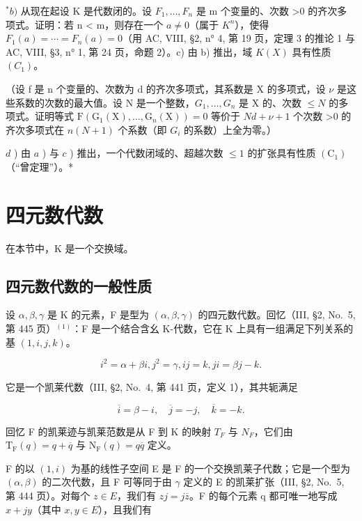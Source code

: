\(^{*}b)\) 从现在起设 K 是代数闭的。设 \(F_{1},\ldots,F_{n}\) 是 m 个变量的、次数 \textgreater0 的齐次多项式。证明：若 n \textless{} m，则存在一个 \(a \neq 0\)（属于 \(K^{n}\)），使得 \(F_{1}(a) = \cdots = F_{n}(a) = 0\)（用 AC, VIII, §2, n° 4, 第 19 页，定理 3 的推论 1 与 AC, VIII, §3, n° 1, 第 24 页，命题 2）。c) 由 b) 推出，域 \(K(X)\) 具有性质 \((C_{1})\)。

（设 f 是 n 个变量的、次数为 d 的齐次多项式，其系数是 X 的多项式，设 \(\nu\) 是这些系数的次数的最大值。设 N 是一个整数，\(G_{1},\ldots,G_{n}\) 是 X 的、次数 \(\leqslant N\) 的多项式。证明等式 \(\mathrm{F}(\mathrm{G}_{1}(\mathrm{X}),\ldots,\mathrm{G}_{n}(\mathrm{X}))=0\) 等价于 \(Nd+\nu+1\) 个次数 \textgreater0 的齐次多项式在 \(n(N+1)\) 个系数（即 \(G_{i}\) 的系数）上全为零。）

\(d\) ) 由 \(a\) ) 与 \(c\) ) 推出，一个代数闭域的、超越次数 \(\leqslant 1\) 的扩张具有性质 \((\mathrm{C}_1)\)（``曾定理''）。*

\section{四元数代数}

在本节中，K 是一个交换域。

\subsection{四元数代数的一般性质}

设 \(\alpha, \beta, \gamma\) 是 K 的元素，F 是型为 \((\alpha, \beta, \gamma)\) 的四元数代数。回忆（III, §2, No.~5, 第 445 页）\(^{(1)}\)：F 是一个结合含幺 K-代数，它在 K 上具有一组满足下列关系的基 \((1, i, j, k)\)。

\[
i ^ {2} = \alpha + \beta i, j ^ {2} = \gamma , i j = k, j i = \beta j - k.\tag{1}
\]

它是一个凯莱代数（III, §2, No.~4, 第 441 页，定义 1），其共轭满足

\[
\overline {{i}} = \beta - i, \quad \overline {{j}} = - j, \quad \overline {{k}} = - k.\tag{2}
\]

回忆 F 的凯莱迹与凯莱范数是从 F 到 K 的映射 \(T_{F}\) 与 \(N_{F}\)，它们由 \(\mathrm{T}_{\mathrm{F}}(q)=q+\overline{q}\) 与 \(\mathrm{N}_{\mathrm{F}}(q)=q\overline{q}\) 定义。

F 的以 \((1,i)\) 为基的线性子空间 E 是 F 的一个交换凯莱子代数；它是一个型为 \((\alpha,\beta)\) 的二次代数，且 F 可等同于由 \(\gamma\) 定义的 E 的凯莱扩张（III, §2, No.~5, 第 444 页）。对每个 \(z\in E\)，我们有 \(zj=j\overline{z}\)。F 的每个元素 q 都可唯一地写成 \(x+jy\)（其中 \(x,y\in E\)），且我们有

